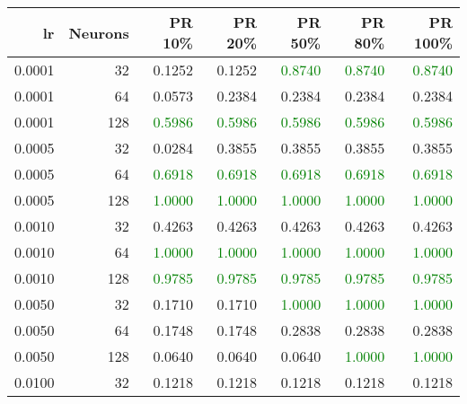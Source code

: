 \begin{tabular}{rrrrrrr}
\toprule
lr & Neurons & PR 10\% & PR 20\% & PR 50\% & PR 80\% & PR 100\% \\
\midrule
0.0001 & 32 & \textcolor{blu} {0.1252} & \textcolor{blu} {0.1252} & \textcolor{green} {0.8740} & \textcolor{green} {0.8740} & \textcolor{green} {0.8740} \\
0.0001 & 64 & \textcolor{blu} {0.0573} & \textcolor{blu} {0.2384} & \textcolor{blu} {0.2384} & \textcolor{blu} {0.2384} & \textcolor{blu} {0.2384} \\
0.0001 & 128 & \textcolor{green} {0.5986} & \textcolor{green} {0.5986} & \textcolor{green} {0.5986} & \textcolor{green} {0.5986} & \textcolor{green} {0.5986} \\
0.0005 & 32 & \textcolor{blu} {0.0284} & \textcolor{blu} {0.3855} & \textcolor{blu} {0.3855} & \textcolor{blu} {0.3855} & \textcolor{blu} {0.3855} \\
0.0005 & 64 & \textcolor{green} {0.6918} & \textcolor{green} {0.6918} & \textcolor{green} {0.6918} & \textcolor{green} {0.6918} & \textcolor{green} {0.6918} \\
0.0005 & 128 & \textcolor{green} {1.0000} & \textcolor{green} {1.0000} & \textcolor{green} {1.0000} & \textcolor{green} {1.0000} & \textcolor{green} {1.0000} \\
0.0010 & 32 & \textcolor{blu} {0.4263} & \textcolor{blu} {0.4263} & \textcolor{blu} {0.4263} & \textcolor{blu} {0.4263} & \textcolor{blu} {0.4263} \\
0.0010 & 64 & \textcolor{green} {1.0000} & \textcolor{green} {1.0000} & \textcolor{green} {1.0000} & \textcolor{green} {1.0000} & \textcolor{green} {1.0000} \\
0.0010 & 128 & \textcolor{green} {0.9785} & \textcolor{green} {0.9785} & \textcolor{green} {0.9785} & \textcolor{green} {0.9785} & \textcolor{green} {0.9785} \\
0.0050 & 32 & \textcolor{blu} {0.1710} & \textcolor{blu} {0.1710} & \textcolor{green} {1.0000} & \textcolor{green} {1.0000} & \textcolor{green} {1.0000} \\
0.0050 & 64 & \textcolor{blu} {0.1748} & \textcolor{blu} {0.1748} & \textcolor{blu} {0.2838} & \textcolor{blu} {0.2838} & \textcolor{blu} {0.2838} \\
0.0050 & 128 & \textcolor{blu} {0.0640} & \textcolor{blu} {0.0640} & \textcolor{blu} {0.0640} & \textcolor{green} {1.0000} & \textcolor{green} {1.0000} \\
0.0100 & 32 & \textcolor{blu} {0.1218} & \textcolor{blu} {0.1218} & \textcolor{blu} {0.1218} & \textcolor{blu} {0.1218} & \textcolor{blu} {0.1218} \\

\end{tabular}
